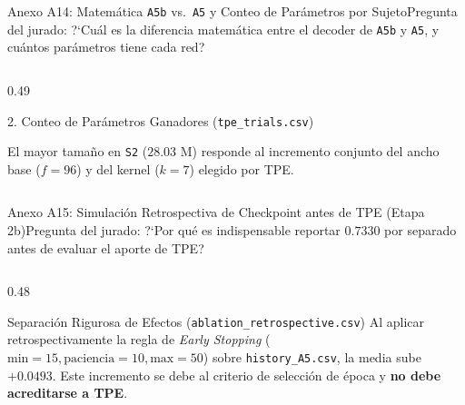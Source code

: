 \begin{frame}{Anexo A14: Matem\'atica \texttt{A5b} vs.\ \texttt{A5} y Conteo de Par\'ametros por Sujeto}{Pregunta del jurado: ?`Cu\'al es la diferencia matem\'atica entre el decoder de \texttt{A5b} y \texttt{A5}, y cu\'antos par\'ametros tiene cada red?}
\begin{columns}[T,onlytextwidth]
\begin{column}{0.49\textwidth}
\begin{block}{2. Conteo de Par\'ametros Ganadores (\texttt{tpe\_trials.csv})}
        \scriptsize\raggedright El mayor tama\~no en \texttt{S2} ($28.03\text{ M}$) responde al incremento conjunto del ancho base ($f=96$) y del kernel ($k=7$) elegido por TPE.
      \end{block}
      \vspace{1mm}
      \hfill\hyperlink{anexo:indice_extra}{}
    \end{column}
  \end{columns}
\end{frame}

\begin{frame}{Anexo A15: Simulaci\'on Retrospectiva de Checkpoint antes de TPE (Etapa 2b)}{Pregunta del jurado: ?`Por qu\'e es indispensable reportar $0.7330$ por separado antes de evaluar el aporte de TPE?}
  \label{anexo:checkpoint_retrospectivo}
  \begin{columns}[c,onlytextwidth]
    \begin{column}{0.48\textwidth}
      \centering

      \vspace{1.5mm}
      \begin{block}{Separaci\'on Rigurosa de Efectos (\texttt{ablation\_retrospective.csv})}
        \scriptsize
        Al aplicar retrospectivamente la regla de \textit{Early Stopping} ($\text{min}=15, \text{paciencia}=10, \text{max}=50$) sobre \texttt{history\_A5.csv}, la media sube $+0.0493$. Este incremento se debe al criterio de selecci\'on de \'epoca y \textbf{no debe acreditarse a TPE}.
      \end{block}
    \end{column}


\end{columns}
\end{frame}
